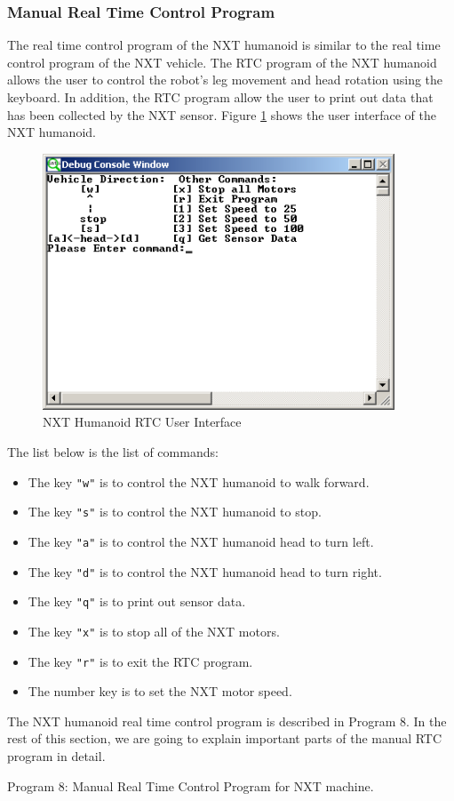 \documentclass[12pt]{article}
\begin{document}
\subsubsection{Manual Real Time Control Program}
The real time control program of the NXT humanoid is similar to the real time control program of the NXT vehicle.
The RTC program of the NXT humanoid allows the user to control the robot's leg movement and head rotation using the
   keyboard.
In addition, the RTC program allow the user to print out data that has been collected by the NXT sensor.
Figure \ref{fig_human_UI} shows the user interface of the NXT humanoid.
\begin{figure}[h]
  \begin{center}
    \includegraphics[height=3in]{figure/mindstorm/human_UI.png}
    \caption{NXT Humanoid RTC User Interface \label{fig_human_UI}}
  \end{center}
\end{figure}
The list below is the list of commands:
\begin{itemize}
\item The key \verb+"w"+ is to control the NXT humanoid to walk forward.
\item The key \verb+"s"+ is to control the NXT humanoid to stop.
\item The key \verb+"a"+ is to control the NXT humanoid head to turn left.
\item The key \verb+"d"+ is to control the NXT humanoid head to turn right.
\item The key \verb+"q"+ is to print out sensor data.
\item The key \verb+"x"+ is to stop all of the NXT motors.
\item The key \verb+"r"+ is to exit the RTC program.
\item The number key is to set the NXT motor speed.
\end{itemize}
The NXT humanoid real time control program is described in Program 8.
In the rest of this section, we are going to explain important parts of the manual RTC program in detail.

\begin{center}
Program 8: Manual Real Time Control Program for NXT machine.
\end{center}
\end{document}
